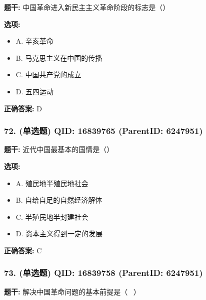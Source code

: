 \documentclass[12pt,UTF8]{ctexart}
\begin{document}
\textbf{题干:}
中国革命进入新民主主义革命阶段的标志是（）



\textbf{选项:}
\begin{itemize}[leftmargin=*]

  \item A. 辛亥革命

  \item B. 马克思主义在中国的传播

  \item C. 中国共产党的成立

  \item D. 五四运动

\end{itemize}

\textbf{正确答案:}
D

\vspace{0.3em}\hrulefill\vspace{0.7em}

\subsubsection*{72. (单选题) \small QID: 16839765 (ParentID: 6247951)}

\textbf{题干:}
近代中国最基本的国情是（）



\textbf{选项:}
\begin{itemize}[leftmargin=*]

  \item A. 殖民地半殖民地社会

  \item B. 自给自足的自然经济解体

  \item C. 半殖民地半封建社会

  \item D. 资本主义得到一定的发展

\end{itemize}

\textbf{正确答案:}
C

\vspace{0.3em}\hrulefill\vspace{0.7em}

\subsubsection*{73. (单选题) \small QID: 16839758 (ParentID: 6247951)}

\textbf{题干:}
解决中国革命问题的基本前提是（  ）
\end{document}
